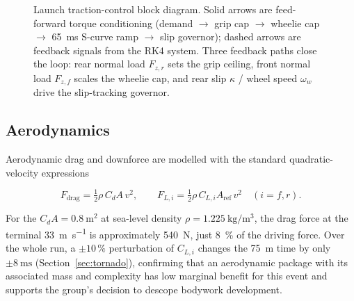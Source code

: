 \documentclass[11pt, a4paper]{report}
\numberwithin{equation}{section}
\begin{document}
\begin{refsection}
\begin{figure}[htbp]
\begin{singlespace}
\end{singlespace}
\caption{Launch traction-control block diagram. Solid arrows are feed-forward
torque conditioning (demand $\to$ grip cap $\to$ wheelie cap $\to$ \SI{65}{\milli\second}
S-curve ramp $\to$ slip governor); dashed arrows are feedback signals from the
RK4 system. Three feedback paths close the loop: rear normal load $F_{z,r}$ sets the
grip ceiling, front normal load $F_{z,f}$ scales the wheelie cap, and rear
slip $\kappa$ / wheel speed $\omega_w$ drive the slip-tracking governor.}
\label{fig:launch_control_flow}
\end{figure}

\subsection{Aerodynamics}
\label{sec:aero}

Aerodynamic drag and downforce are modelled with the standard
quadratic-velocity expressions

\begin{equation}
F_\text{drag} = \tfrac{1}{2} \rho \, C_d A \, v^2,
\qquad
F_{L,i} = \tfrac{1}{2} \rho \, C_{L,i} A_\text{ref} \, v^2
\quad (i = f, r).
\label{eq:aero}
\end{equation}

For the $C_d A = \SI{0.8}{\metre\squared}$ at sea-level
density $\rho = \SI{1.225}{\kilo\gram\per\metre\cubed}$, the drag
force at the terminal \SI{33}{\metre\per\second} is approximately
\SI{540}{\newton}, just \SI{8}{\percent} of the driving
force. Over the whole run, a $\pm 10\,\%$ perturbation of $C_{L,i} $
changes the \SI{75}{\metre} time by only $\pm\SI{8}{\milli\second}$
(Section~\ref{sec:tornado}), confirming that an aerodynamic package
with its associated mass and complexity has low marginal benefit for
this event and supports the group's decision to descope bodywork
development.


\end{refsection}
\end{document}
